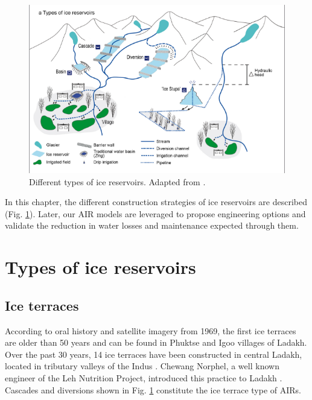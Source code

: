 \begin{figure}[htb]
	\centering
	\includegraphics[width=\textwidth]{figs/AIR_designs}
	\caption{Different types of ice reservoirs. Adapted from \citet{nusserSociohydrologyArtificialGlaciers2019}.}
	\label{fig:AIRdesigns}
\end{figure}

In this chapter, the different construction strategies of ice reservoirs are described (Fig.
\ref{fig:AIRdesigns}). Later, our AIR models are leveraged to propose engineering options and validate the
reduction in water losses and maintenance expected through them.

\section{Types of ice reservoirs}

\subsection{Ice terraces}

According to oral history and satellite imagery from 1969, the first ice terraces are older than 50 years and can
be found in Phuktse and Igoo villages of Ladakh. Over the past 30 years, 14 ice terraces have been constructed in central Ladakh,
located in tributary valleys of the Indus \citep{norphelArtificialGlacierHigh2009,
	nusserSociohydrologyArtificialGlaciers2019}. Chewang Norphel, a well known engineer of the Leh Nutrition
Project, introduced this practice to Ladakh \citep{vinceGlacierMan2009}. Cascades and diversions shown in Fig.
\ref{fig:AIRdesigns} constitute the ice terrace type of AIRs.

